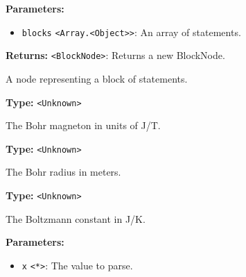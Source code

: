 \documentclass[12pt,a4paper]{article}
\begin{document}
\vspace{5mm}
\noindent {}


\noindent \textbf{Parameters:}
\begin{itemize}
  \item \texttt{blocks} \texttt{<Array.<Object>>}: An array of statements.
\end{itemize}

\noindent \textbf{Returns:} \texttt{<BlockNode>}: Returns a new BlockNode.

\noindent A node representing a block of statements.

\vspace{5mm}
\noindent {}\vspace{4mm}


\noindent \textbf{Type:} \texttt{<Unknown>}

\noindent The Bohr magneton in units of \textasciigrave{}J/T\textasciigrave{}.

\vspace{5mm}
\noindent {}\vspace{4mm}


\noindent \textbf{Type:} \texttt{<Unknown>}

\noindent The Bohr radius in meters.

\vspace{5mm}
\noindent {}\vspace{4mm}


\noindent \textbf{Type:} \texttt{<Unknown>}

\noindent The Boltzmann constant in \textasciigrave{}J/K\textasciigrave{}.

\vspace{5mm}
\noindent {}


\noindent \textbf{Parameters:}
\begin{itemize}
  \item \texttt{x} \texttt{<*>}: The value to parse.
\end{itemize}
\end{document}
